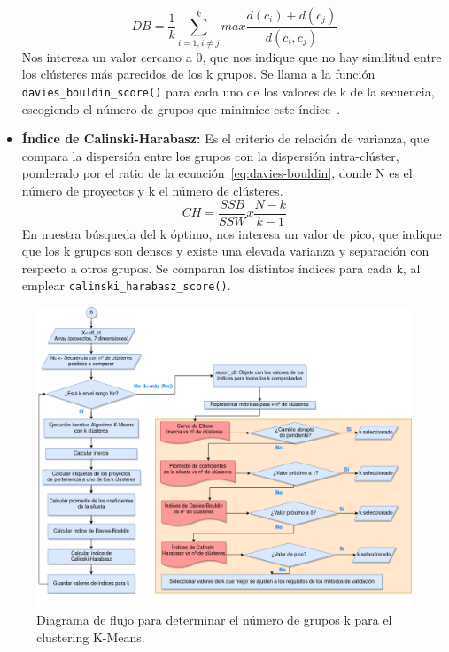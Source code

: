 \documentclass[a4paper, 12pt]{book}
\begin{document}
\begin{itemize}
    \begin{equation}
        DB=\frac{1}{k}\sum \limits _{i=1,i\neq j}^{k} max\frac{d(c_i)+d(c_j)}{d(c_i ,c_j)}
    \label{eq:davies-bouldin}
    \end{equation} 
    Nos interesa un valor cercano a 0, que nos indique que no hay similitud entre los clústeres más parecidos de los k grupos. Se llama a la función \texttt{davies\_bouldin\_score()} para cada uno de los valores de k de la secuencia, escogiendo el número de grupos que minimice este índice~\cite{davies1979cluster}.
    \item \textbf{Índice de Calinski-Harabasz:} Es el criterio de relación de varianza, que compara la dispersión entre los grupos con la dispersión intra-clúster, ponderado por el ratio de la ecuación~\eqref{eq:davies-bouldin}, donde N es el número de proyectos y k el número de clústeres.
    \begin{equation}
        CH=\frac{SSB}{SSW}x\frac{N-k}{k-1}
        \label{eq:ch}
    \end{equation} 
    En nuestra búsqueda del k óptimo, nos interesa un valor de pico, que indique que los k grupos son densos y existe una elevada varianza y separación con respecto a otros grupos. Se comparan los distintos índices para cada k, al emplear \texttt{calinski\_harabasz\_score()}.	
\end{itemize}

\begin{figure}[H]
    \centering
    \includegraphics[height=.5\textheight]{img/kmeans_diseno.png}
    \caption{Diagrama de flujo para determinar el número de grupos k para el clustering K-Means.}\label{fig:kmeans}
\end{figure}
\end{document}
